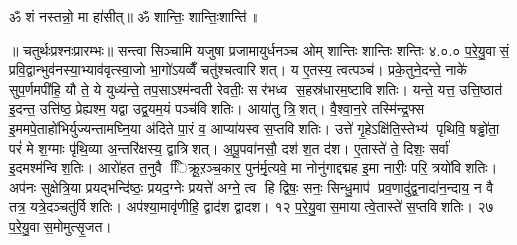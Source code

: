 ॐ शं नस्तन्नो॒ मा हा॑सीत्॥ ॐ शान्तिः॒ शान्तिः॒शान्ति॑॥



\setcounter{anuvakam}{0}
॥ चतुर्थःप्रश्नःप्रारम्भः॥ सन्त्वा सिञ्चामि यजुषा प्रजामायुर्धनञ्च ओम् शान्तिः  शान्तिः  शन्तिः
४.०.०
प॒रे॒यु॒वासं॒ प्रवि॒द्वान्भुव॑नस्या॒भ्याव॑वृत्स्वा॒जो भा॒गो॑ऽयव्वैँ चतु॑श्चत्वारिशत्। य ए॒तस्य॒ त्वत्पञ्च॑। प्रके॒तुने॒दन्ते॒ नाके॑ सुप॒र्णमपी॑हि॒ यौ ते॒ ये युध्य॑न्ते॒ तप॒साऽश्म॑न्वती रेवतीः॒ सर॑भध्व स॒हस्र॑धारम॒ष्टाविशतिः। यन्ते॒ यत्त॒ उत्ति॒ष्ठात॑ इ॒दन्त॒ उत्ति॑ष्ठ॒ प्रेह्यश्म॒\an{} यद्वा उद्व॒यम॒यं पञ्च॑विशतिः। आया॑तु त्रि॒शत्। वै॒श्वा॒न॒रे तस्मि॑न्द्र॒फ्स इ॒ममपे॒ताहो॑भिर्युज्यन्तामघ्नि॒या अ॑दिते पा॒रं व॒ आप्या॑यस्व स॒प्तविशतिः। उत्ते॑ गृ॒हेऽक्षि॑ति॒स्तेभ्य॑ पृथिवि॒ षड्ढो॑ता॒ परं॑ मे श॒ग्माः पृ॑थि॒व्या अ॒न्तरि॑क्षस्य॒ द्वात्रिशत्। अ॒पू॒पवा॑नसौ॒ दश॑ श॒त द॑श। ए॒तास्ते॑ ते॒ दिशः॒ सर्वा॑ इ॒दमश्म॑न्विश॒तिः। आरो॑हत त॒नुवै ििक्रू॒ऱञ्च॒कार॒ पुन॑र्मृ॒त्यवे॒ मा नोनु॑गाद्दद्मह इ॒मा नारीः॒ परि॒ त्रयो॑विशतिः। अप॑नः सुक्षेत्रि॒या प्रयद्भन्दि॑ष्ठः॒ प्रयद॒ग्नेः प्रयत्ते॑ अग्ने॒ त्व हि द्विषः॒ सनः॒ सिन्धु॒माप॑ प्रव॒णादु॑द्व॒नादा॑न॒न्दाय॒ न वै तत्र॒ यत्रे॒दञ्चतु॑र्विशतिः। अप॑श्या॒मावृ॑णीहि॒ द्वाद॑श द्वादश। १२ प॒रे॒यु॒वास॒मायात्वे॒तास्ते॑ स॒प्तविशतिः। २७ प॒रे॒यु॒वास॒मोमुत्सृ॒जत।
\anuvakamend

